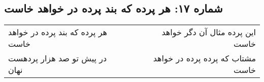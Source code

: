 \begin{center}
\section*{شماره ۱۷: هر پرده که بند پرده در خواهد خاست}
\label{sec:017}
\begin{longtable}{l p{0.5cm} r}
هر پرده که بند پرده در خواهد خاست
&&
این پرده مثال آن دگر خواهد خاست
\\
در پیش تو صد هزار پردهست نهان
&&
مشتاب که پرده پرده در خواهد خاست
\\
\end{longtable}
\end{center}
